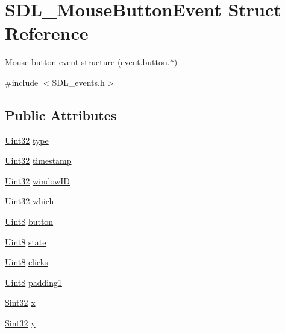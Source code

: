 \hypertarget{struct_s_d_l___mouse_button_event}{}\section{S\+D\+L\+\_\+\+Mouse\+Button\+Event Struct Reference}
\label{struct_s_d_l___mouse_button_event}


Mouse button event structure (\hyperlink{union_s_d_l___event_ab6da2fa2687e5f849f270adecc64785f}{event.\+button}.$\ast$)  




{\ttfamily \#include $<$S\+D\+L\+\_\+events.\+h$>$}

\subsection*{Public Attributes}
\begin{DoxyCompactItemize}
\item 
\hyperlink{_s_d_l__stdinc_8h_add440eff171ea5f55cb00c4a9ab8672d}{Uint32} \hyperlink{struct_s_d_l___mouse_button_event_af64cb09ea68b8081ecc8ee498552e3d7}{type}
\item 
\hyperlink{_s_d_l__stdinc_8h_add440eff171ea5f55cb00c4a9ab8672d}{Uint32} \hyperlink{struct_s_d_l___mouse_button_event_ab05e8a454692608ff56c502e95799c56}{timestamp}
\item 
\hyperlink{_s_d_l__stdinc_8h_add440eff171ea5f55cb00c4a9ab8672d}{Uint32} \hyperlink{struct_s_d_l___mouse_button_event_ab3b855d4b543b5d02fcf5d56e4421393}{window\+ID}
\item 
\hyperlink{_s_d_l__stdinc_8h_add440eff171ea5f55cb00c4a9ab8672d}{Uint32} \hyperlink{struct_s_d_l___mouse_button_event_a366aef59a0f393afc8a3561e741825df}{which}
\item 
\hyperlink{_s_d_l__stdinc_8h_a2944638813a090aa23e62f4da842c3e2}{Uint8} \hyperlink{struct_s_d_l___mouse_button_event_a1a4680e19ae06d02d2093f0bcba1b24c}{button}
\item 
\hyperlink{_s_d_l__stdinc_8h_a2944638813a090aa23e62f4da842c3e2}{Uint8} \hyperlink{struct_s_d_l___mouse_button_event_a8809cef85cfffad4f2059f2ba4fc6a3d}{state}
\item 
\hyperlink{_s_d_l__stdinc_8h_a2944638813a090aa23e62f4da842c3e2}{Uint8} \hyperlink{struct_s_d_l___mouse_button_event_aa606bebcbc3ffc7e932016039c2a36a1}{clicks}
\item 
\hyperlink{_s_d_l__stdinc_8h_a2944638813a090aa23e62f4da842c3e2}{Uint8} \hyperlink{struct_s_d_l___mouse_button_event_a765957d218d16fa00558fa4d20e80689}{padding1}
\item 
\hyperlink{_s_d_l__stdinc_8h_a7a90b941db9d4582e9ad7abb9940ff7e}{Sint32} \hyperlink{struct_s_d_l___mouse_button_event_a5bb9c61b86e999f58637511e32e3a076}{x}
\item 
\hyperlink{_s_d_l__stdinc_8h_a7a90b941db9d4582e9ad7abb9940ff7e}{Sint32} \hyperlink{struct_s_d_l___mouse_button_event_a7ccb5c55a7ddadce723f4ea6d5269540}{y}
\end{DoxyCompactItemize}



